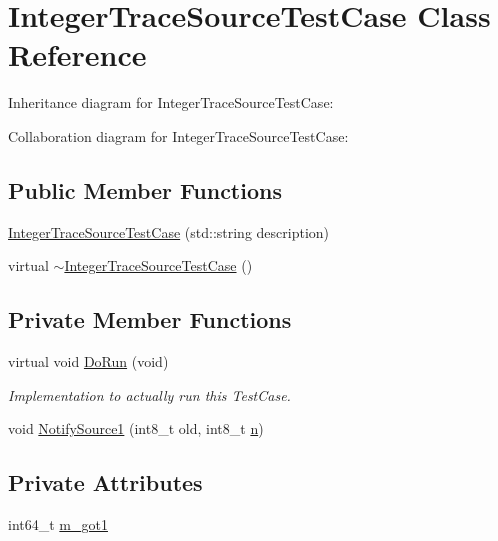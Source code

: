\hypertarget{classIntegerTraceSourceTestCase}{}\section{Integer\+Trace\+Source\+Test\+Case Class Reference}
\label{classIntegerTraceSourceTestCase}


Inheritance diagram for Integer\+Trace\+Source\+Test\+Case\+:


Collaboration diagram for Integer\+Trace\+Source\+Test\+Case\+:
\subsection*{Public Member Functions}
\begin{DoxyCompactItemize}
\item 
\hyperlink{classIntegerTraceSourceTestCase_a3a5d6a39129c5a68ff0301202a1caa27}{Integer\+Trace\+Source\+Test\+Case} (std\+::string description)
\item 
virtual \hyperlink{classIntegerTraceSourceTestCase_a886c7da39b7d8f2f57ceba5cda7ee49f}{$\sim$\+Integer\+Trace\+Source\+Test\+Case} ()
\end{DoxyCompactItemize}
\subsection*{Private Member Functions}
\begin{DoxyCompactItemize}
\item 
virtual void \hyperlink{classIntegerTraceSourceTestCase_a93b846039781c0cc706eba043bd17e48}{Do\+Run} (void)
\begin{DoxyCompactList}\small\item\em Implementation to actually run this Test\+Case. \end{DoxyCompactList}\item 
void \hyperlink{classIntegerTraceSourceTestCase_af8fe2912cc7dd753132471139207a62b}{Notify\+Source1} (int8\+\_\+t old, int8\+\_\+t \hyperlink{lte__link__budget__x2__handover__measures_8m_abdb05bc5a064cf642a06c83b3392f148}{n})
\end{DoxyCompactItemize}
\subsection*{Private Attributes}
\begin{DoxyCompactItemize}
\item 
int64\+\_\+t \hyperlink{classIntegerTraceSourceTestCase_a191fafb3fcaa0c793101de8af0ff6ada}{m\+\_\+got1}
\end{DoxyCompactItemize}
